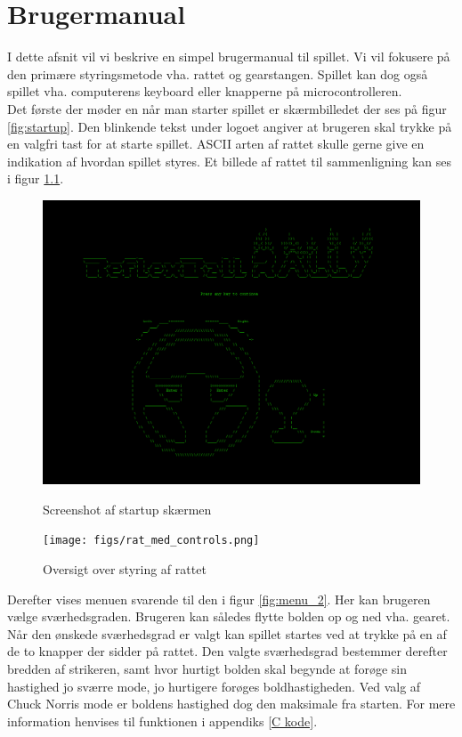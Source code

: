\chapter{Brugermanual}

I dette afsnit vil vi beskrive en simpel brugermanual til spillet. Vi vil fokusere på den primære styringsmetode vha. rattet og gearstangen. Spillet kan dog også spillet vha. computerens keyboard eller knapperne på microcontrolleren.
\\

Det første der møder en når man starter spillet er skærmbilledet der ses på figur \ref{fig:startup}. Den blinkende tekst under logoet angiver at brugeren skal trykke på en valgfri tast for at starte spillet. ASCII arten af rattet skulle gerne give en indikation af hvordan spillet styres. Et billede af rattet til sammenligning kan ses i figur \ref{fig:rat_med_controls}.

\begin{figure}[h!]
\begin{minipage}[b]{0.49\textwidth}
\includegraphics[width=\linewidth]{figs/screenshots/startup_crop_ny.png}
\caption{Screenshot af startup skærmen}
\label{fig:startup}
\end{minipage}\hfill
\begin{minipage}[b]{0.49\textwidth}
\texttt{[image: figs/rat\_med\_controls.png]}
\caption{Oversigt over styring af rattet}
\label{fig:rat_med_controls}
\end{minipage}\hfill
\end{figure}

Derefter vises menuen svarende til den i figur \ref{fig:menu_2}. Her kan brugeren vælge sværhedsgraden. Brugeren kan således flytte bolden op og ned vha. gearet. Når den ønskede sværhedsgrad er valgt kan spillet startes ved at trykke på en af de to knapper der sidder på rattet. Den valgte sværhedsgrad bestemmer derefter bredden af strikeren, samt hvor hurtigt bolden skal begynde at forøge sin hastighed jo sværre mode, jo hurtigere forøges boldhastigheden. Ved valg af Chuck Norris mode er boldens hastighed dog den maksimale fra starten. For mere information henvises til funktionen  i appendiks \ref{C kode}. \\

